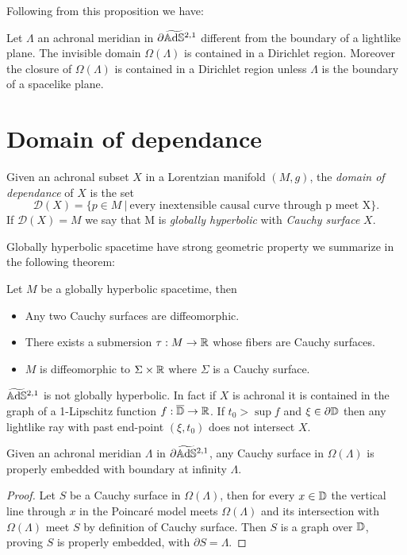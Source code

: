 Following from this proposition we have:
\begin{proposition}
    Let $\Lambda$ an achronal meridian in $\partial\widetilde{\mathbb{A}\mathrm{d}\mathbb{S}}{}^{2,1}$ different from the boundary of a lightlike plane. The invisible domain $\Omega(\Lambda)$ is contained in a Dirichlet region. Moreover the closure of $\Omega(\Lambda)$ is contained in a Dirichlet region unless $\Lambda$ is the boundary of a spacelike plane.
\end{proposition}
\section{Domain of dependance}
\begin{definition}
    Given an achronal subset $X$ in a Lorentzian manifold $(M,g)$, the \textit{domain of dependance} of $X$ is the set
    \[
        \mathcal{D}(X)= \{ p \in M \ | \ \text{every inextensible causal curve through p meet X} \}.
    \]
    If $\mathcal{D}(X)=M$ we say that M is  \textit{globally hyperbolic} with \textit{Cauchy surface} $X$.
\end{definition}
Globally hyperbolic spacetime have strong geometric property we summarize in the following theorem:
\begin{theorem} \label{GH_structure}
    Let $M$ be a globally hyperbolic spacetime, then
    \begin{itemize}
        \item Any two Cauchy surfaces are diffeomorphic.
        \item There  exists a submersion $\tau : M \to \mathbb{R}$ whose fibers are Cauchy surfaces.
        \item $M$ is diffeomorphic to $\Sigma \times \mathbb{R}$ where $\Sigma$ is a Cauchy surface.
    \end{itemize}
\end{theorem}
\begin{observation}
    $\widetilde{\mathbb{A}\mathrm{d}\mathbb{S}}{}^{2,1}$ is not globally hyperbolic. In fact if $X$ is achronal it is contained in the graph of a 1-Lipschitz function $f: \overline{\mathbb{D}} \to \mathbb{R}$. If $t_0 > \sup f$ and $\xi \in \partial\mathbb{D}$ then any lightlike ray with past end-point $(\xi,t_0)$ does not intersect $X$.
\end{observation}
\begin{lemma}
    Given an achronal meridian $\Lambda$ in $\partial\widetilde{\mathbb{A}\mathrm{d}\mathbb{S}}{}^{2,1}$, any Cauchy surface in $\Omega(\Lambda)$ is properly embedded with boundary at infinity $\Lambda$.
\end{lemma}
\begin{proof}
    Let $S$ be a Cauchy surface in $\Omega(\Lambda)$, then for every $x\in \mathbb{D}$ the vertical line through $x$ in the Poincaré model meets $\Omega(\Lambda)$ and its intersection with $\Omega(\Lambda)$ meet $S$ by definition of Cauchy surface. Then $S$ is a graph over $\mathbb{D}$, proving $S$ is properly embedded, with $\partial S = \Lambda$.
\end{proof}

